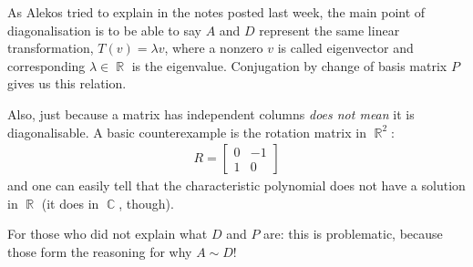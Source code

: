 \documentclass[answers,11pt]{exam}
\theoremstyle{definition}
\DeclareMathOperator{\R}{\mathbb{R}}
\DeclareMathOperator{\1}{\mathbbm{1}}
\DeclareMathOperator{\CC}{\mathbb{C}}
\begin{document}
\begin{enumerate}
	As Alekos tried to explain in the notes posted last week, the main point of diagonalisation is to be able to say $A$ and $D$ represent the same linear transformation, $T(v) = \lambda v$, where a nonzero $v$ is called eigenvector and corresponding $\lambda \in \R$ is the eigenvalue. Conjugation by change of basis matrix $P$ gives us this relation.
	
	Also, just because a matrix has independent columns \textit{does not mean} it is diagonalisable. A basic counterexample is the rotation matrix in $\R^2$:
	\begin{align*}
	R = \begin{bmatrix}
	0 & -1 \\ 1 & 0
	\end{bmatrix}
	\end{align*}
	and one can easily tell that the characteristic polynomial does not have a solution in $\R$ (it does in $\CC$, though).
	
	For those who did not explain what $D$ and $P$ are: this is problematic, because those form the reasoning for why $A \sim D$!
\end{enumerate}
\end{document}
